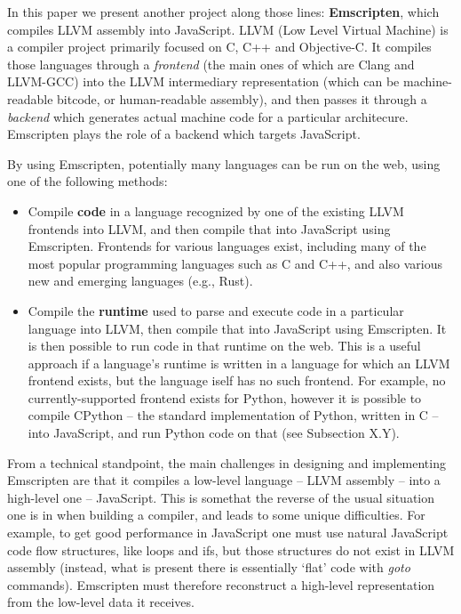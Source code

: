 \documentclass[11pt]{proc}
\begin{document}
In this paper we present another project along those lines: \textbf{Emscripten},
which compiles LLVM assembly into JavaScript. LLVM (Low Level Virtual
Machine) is a compiler project primarily focused on C, C++ and
Objective-C. It compiles those languages through a \emph{frontend} (the
main ones of which are Clang and LLVM-GCC) into the
LLVM intermediary representation (which can be machine-readable
bitcode, or human-readable assembly), and then passes it
through a \emph{backend} which generates actual machine code for a particular
architecure. Emscripten plays the role of a backend which targets JavaScript.

By using Emscripten, potentially many languages can be
run on the web, using one of the following methods:
\begin{itemize}
\item Compile \textbf{code} in a language recognized by one of the existing LLVM frontends
      into LLVM, and then compile that
      into JavaScript using Emscripten. Frontends for various languages
      exist, including many of the most popular programming languages such as C and
      C++, and also various new and emerging languages (e.g., Rust).
\item Compile the \textbf{runtime} used to parse and execute code in
      a particular language into LLVM, then compile that into JavaScript using
      Emscripten. It is then possible to run code in that runtime on the web.
      This is a useful approach if
      a language's runtime is written in a language for which an LLVM
      frontend exists, but the language iself has no such frontend. For
      example, no currently-supported frontend exists for Python, however
      it is possible to compile CPython -- the standard implementation of
      Python, written in C -- into JavaScript, and run Python code on that
      (see Subsection X.Y).
\end{itemize}

From a technical standpoint, the main challenges in designing and implementing
Emscripten are that it compiles a low-level language -- LLVM assembly -- into
a high-level one -- JavaScript. This is somethat the reverse of the usual
situation one is in when building a compiler, and leads to some unique
difficulties. For example, to get good performance in JavaScript one must
use natural JavaScript code flow structures, like loops and ifs, but
those structures do not exist in LLVM assembly (instead, what is present
there is essentially `flat' code with \emph{goto} commands).
Emscripten must therefore reconstruct a high-level
representation from the low-level data it receives.
\end{document}
